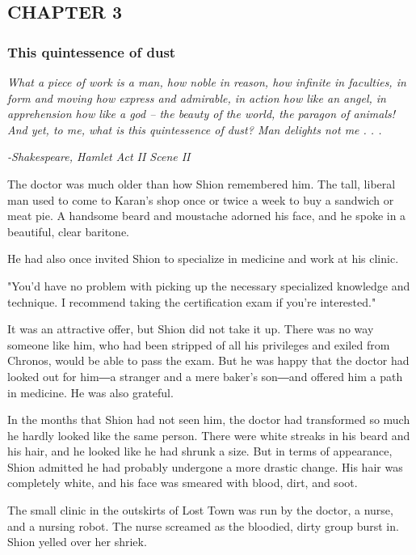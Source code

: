 \hypertarget{index_split_003.htmlux5cux23calibre_pb_0}{}

\hypertarget{index_split_003.htmlux5cux23calibre_toc_4}{%
\subsection{CHAPTER 3}\label{index_split_003.htmlux5cux23calibre_toc_4}}

\subsubsection{This quintessence of dust}

\emph{What a piece of work is a man, how noble in reason, how infinite
in faculties, in form and moving how express and admirable, in action
how like an angel, in apprehension how like a god -- the beauty of the
world, the paragon of animals! And yet, to me, what is this quintessence
of dust? Man delights not me . . .}

\emph{-Shakespeare, Hamlet Act II Scene II~}

The doctor was much older than how Shion remembered him. The tall,
liberal man used to come to Karan's shop once or twice a week to buy a
sandwich or meat pie. A handsome beard and moustache adorned his face,
and he spoke in a beautiful, clear baritone.

He had also once invited Shion to specialize in medicine and work at his
clinic.

"You'd have no problem with picking up the necessary specialized
knowledge and technique. I recommend taking the certification exam if
you're interested."

It was an attractive offer, but Shion did not take it up. There was no
way someone like him, who had been stripped of all his privileges and
exiled from Chronos, would be able to pass the exam. But he was happy
that the doctor had looked out for him―a stranger and a mere baker's
son―and offered him a path in medicine. He was also grateful.

In the months that Shion had not seen him, the doctor had transformed so
much he hardly looked like the same person. There were white streaks in
his beard and his hair, and he looked like he had shrunk a size. But in
terms of appearance, Shion admitted he had probably undergone a more
drastic change. His hair was completely white, and his face was smeared
with blood, dirt, and soot.

The small clinic in the outskirts of Lost Town was run by the doctor, a
nurse, and a nursing robot. The nurse screamed as the bloodied, dirty
group burst in. Shion yelled over her shriek.

